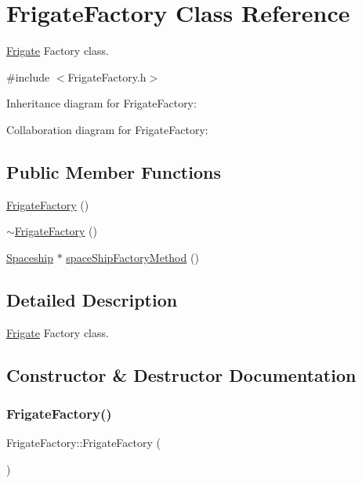 \hypertarget{classFrigateFactory}{}\section{Frigate\+Factory Class Reference}
\label{classFrigateFactory}


\hyperlink{classFrigate}{Frigate} Factory class.  




{\ttfamily \#include $<$Frigate\+Factory.\+h$>$}



Inheritance diagram for Frigate\+Factory\+:


Collaboration diagram for Frigate\+Factory\+:
\subsection*{Public Member Functions}
\begin{DoxyCompactItemize}
\item 
\hyperlink{classFrigateFactory_a1025a996e1e48f03bacac243ec1540b8}{Frigate\+Factory} ()
\item 
\hyperlink{classFrigateFactory_ae1433ffe26d615f35bf62d00c026c6a9}{$\sim$\+Frigate\+Factory} ()
\item 
\hyperlink{classSpaceship}{Spaceship} $\ast$ \hyperlink{classFrigateFactory_adfe55ec4fd28b09ab5f0bba3e782c87d}{space\+Ship\+Factory\+Method} ()
\end{DoxyCompactItemize}


\subsection{Detailed Description}
\hyperlink{classFrigate}{Frigate} Factory class. 

\subsection{Constructor \& Destructor Documentation}
\mbox{\label{classFrigateFactory_a1025a996e1e48f03bacac243ec1540b8}} 
\subsubsection{\texorpdfstring{Frigate\+Factory()}{FrigateFactory()}}
{\footnotesize\ttfamily Frigate\+Factory\+::\+Frigate\+Factory (\begin{DoxyParamCaption}{ }\end{DoxyParamCaption})}

